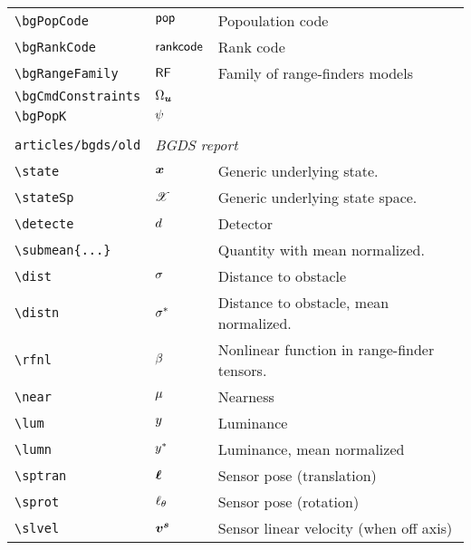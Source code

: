 \begin{longtable}{lll}
 {\color[rgb]{0.5,0.5,0.5}\texttt{\textbackslash bgPopCode}} & $\mathsf{pop}$ &  Popoulation code\\ 
 {\color[rgb]{0.5,0.5,0.5}\texttt{\textbackslash bgRankCode}} & $\mathsf{rankcode}$ &  Rank code\\ 
 {\color[rgb]{0.5,0.5,0.5}\texttt{\textbackslash bgRangeFamily}} & $\mathsf{RF}$ &  Family of range-finders models\\ 
 {\color[rgb]{0.5,0.5,0.5}\texttt{\textbackslash bgCmdConstraints}} & ${\Omega}_{\boldsymbol{u}}$ & \\ 
 {\color[rgb]{0.5,0.5,0.5}\texttt{\textbackslash bgPopK}} & $\psi$ & \\ 
  &  & \\ 
 {\color[rgb]{0.5,0.5,0.5}\texttt{articles/bgds/old}} & \multicolumn{2}{l}{\emph{BGDS report}}\\ 
 \hline
{\color[rgb]{0.5,0.5,0.5}\texttt{\textbackslash state}} & $\boldsymbol{x}$ &  Generic underlying state.\\ 
 {\color[rgb]{0.5,0.5,0.5}\texttt{\textbackslash stateSp}} & $\mathscr{X}$ &  Generic underlying state space.\\ 
 {\color[rgb]{0.5,0.5,0.5}\texttt{\textbackslash detecte}} & $d$ &  Detector\\ 
 {\color[rgb]{0.5,0.5,0.5}\texttt{\textbackslash submean\{...\}}} &  &  Quantity with mean normalized.\\ 
 {\color[rgb]{0.5,0.5,0.5}\texttt{\textbackslash dist}} & $\sigma$ &  Distance to obstacle\\ 
 {\color[rgb]{0.5,0.5,0.5}\texttt{\textbackslash distn}} & ${\sigma}^{*}$ &  Distance to obstacle, mean normalized.\\ 
 {\color[rgb]{0.5,0.5,0.5}\texttt{\textbackslash rfnl}} & $\beta$ &  Nonlinear function in range-finder tensors.\\ 
 {\color[rgb]{0.5,0.5,0.5}\texttt{\textbackslash near}} & $\mu$ &  Nearness\\ 
 {\color[rgb]{0.5,0.5,0.5}\texttt{\textbackslash lum}} & $y$ &  Luminance\\ 
 {\color[rgb]{0.5,0.5,0.5}\texttt{\textbackslash lumn}} & ${y}^{*}$ &  Luminance, mean normalized\\ 
 {\color[rgb]{0.5,0.5,0.5}\texttt{\textbackslash sptran}} & $\boldsymbol{\ell}$ &  Sensor pose (translation)\\ 
 {\color[rgb]{0.5,0.5,0.5}\texttt{\textbackslash sprot}} & $\ell_{\theta}$ &  Sensor pose (rotation)\\ 
 {\color[rgb]{0.5,0.5,0.5}\texttt{\textbackslash slvel}} & $\boldsymbol{v^s}$ &  Sensor linear velocity (when off axis)\\ 

\end{longtable}
